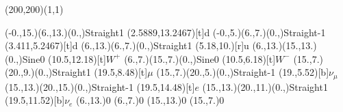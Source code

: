 \documentclass[12pt]{article}
\begin{document}
 
 \thispagestyle{empty}
	
 \begin{feynartspicture}(200,200)(1,1) 
 \FADiagram{} 
 
\FAProp(-0.,15.)(6.,13.)(0.,){Straight}{1}
\FALabel(2.5889,13.2467)[t]{d}
\FAProp(-0.,5.)(6.,7.)(0.,){Straight}{-1}
\FALabel(3.411,5.2467)[t]{d}
\FAProp(6.,13.)(6.,7.)(0.,){Straight}{1}
\FALabel(5.18,10.)[r]{u}
\FAProp(6.,13.)(15.,13.)(0.,){Sine}{0}
\FALabel(10.5,12.18)[t]{$W^+$}
\FAProp(6.,7.)(15.,7.)(0.,){Sine}{0}
\FALabel(10.5,6.18)[t]{$W^-$}
\FAProp(15.,7.)(20.,9.)(0.,){Straight}{1}
\FALabel(19.5,8.48)[t]{$\mu$}
\FAProp(15.,7.)(20.,5.)(0.,){Straight}{-1}
\FALabel(19.,5.52)[b]{$\nu_{\mu}$}
\FAProp(15.,13.)(20.,15.)(0.,){Straight}{-1}
\FALabel(19.5,14.48)[t]{$e$}
\FAProp(15.,13.)(20.,11.)(0.,){Straight}{1}
\FALabel(19.5,11.52)[b]{$\nu_e$}
\FAVert(6.,13.){0}
\FAVert(6.,7.){0}
\FAVert(15.,13.){0}
\FAVert(15.,7.){0}
	
 
 \end{feynartspicture} 
 
\end{document}

